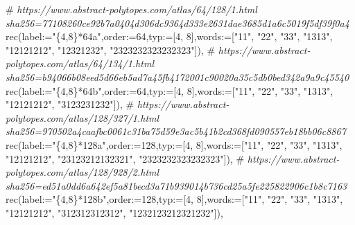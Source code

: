 \documentclass[
  10pt,
  letterpaper,
]{article}
\newenvironment{Shaded}{}{}
\newcommand{\CommentTok}[1]{\textcolor[rgb]{0.38,0.63,0.69}{\textit{#1}}}
\newcommand{\ExtensionTok}[1]{#1}
\newcommand{\FloatTok}[1]{\textcolor[rgb]{0.25,0.63,0.44}{#1}}
\newcommand{\NormalTok}[1]{#1}
\newcommand{\OperatorTok}[1]{\textcolor[rgb]{0.40,0.40,0.40}{#1}}
\newcommand{\StringTok}[1]{\textcolor[rgb]{0.25,0.44,0.63}{#1}}
\newcommand{\VariableTok}[1]{\textcolor[rgb]{0.10,0.09,0.49}{#1}}
\begin{document}
\begin{Shaded}
\begin{Highlighting}[]
\NormalTok{\#}\CommentTok{ https://www.abstract{-}polytopes.com/atlas/64/128/1.html sha256=77108260ce92b7a0404d306dc9364d333e2631dae3685d1a6c5019f5df39f0a4}
\ExtensionTok{rec}\NormalTok{(}\VariableTok{label}\OperatorTok{:=}\StringTok{"\{4,8\}*64a"}\OperatorTok{,}\VariableTok{order}\OperatorTok{:=}\FloatTok{64}\OperatorTok{,}\VariableTok{typ}\OperatorTok{:=}\NormalTok{[}\FloatTok{4}\OperatorTok{,} \FloatTok{8}\NormalTok{]}\OperatorTok{,}\VariableTok{words}\OperatorTok{:=}\NormalTok{[}\StringTok{"11"}\OperatorTok{,} \StringTok{"22"}\OperatorTok{,} \StringTok{"33"}\OperatorTok{,} \StringTok{"1313"}\OperatorTok{,} \StringTok{"12121212"}\OperatorTok{,} \StringTok{"12321232"}\OperatorTok{,} \StringTok{"2323232323232323"}\NormalTok{])}\OperatorTok{,}
\NormalTok{\#}\CommentTok{ https://www.abstract{-}polytopes.com/atlas/64/134/1.html sha256=b94066b08eed5d66eb5ad7a45fb4172001c90020a35c5db0bed342a9a9c45540}
\ExtensionTok{rec}\NormalTok{(}\VariableTok{label}\OperatorTok{:=}\StringTok{"\{4,8\}*64b"}\OperatorTok{,}\VariableTok{order}\OperatorTok{:=}\FloatTok{64}\OperatorTok{,}\VariableTok{typ}\OperatorTok{:=}\NormalTok{[}\FloatTok{4}\OperatorTok{,} \FloatTok{8}\NormalTok{]}\OperatorTok{,}\VariableTok{words}\OperatorTok{:=}\NormalTok{[}\StringTok{"11"}\OperatorTok{,} \StringTok{"22"}\OperatorTok{,} \StringTok{"33"}\OperatorTok{,} \StringTok{"1313"}\OperatorTok{,} \StringTok{"12121212"}\OperatorTok{,} \StringTok{"3123231232"}\NormalTok{])}\OperatorTok{,}
\NormalTok{\#}\CommentTok{ https://www.abstract{-}polytopes.com/atlas/128/327/1.html sha256=970502a4caafbc0061c31ba75d59e3ac5b41b2cd368fd090557eb18bb06c8867}
\ExtensionTok{rec}\NormalTok{(}\VariableTok{label}\OperatorTok{:=}\StringTok{"\{4,8\}*128a"}\OperatorTok{,}\VariableTok{order}\OperatorTok{:=}\FloatTok{128}\OperatorTok{,}\VariableTok{typ}\OperatorTok{:=}\NormalTok{[}\FloatTok{4}\OperatorTok{,} \FloatTok{8}\NormalTok{]}\OperatorTok{,}\VariableTok{words}\OperatorTok{:=}\NormalTok{[}\StringTok{"11"}\OperatorTok{,} \StringTok{"22"}\OperatorTok{,} \StringTok{"33"}\OperatorTok{,} \StringTok{"1313"}\OperatorTok{,} \StringTok{"12121212"}\OperatorTok{,} \StringTok{"23123212132321"}\OperatorTok{,} \StringTok{"2323232323232323"}\NormalTok{])}\OperatorTok{,}
\NormalTok{\#}\CommentTok{ https://www.abstract{-}polytopes.com/atlas/128/928/2.html sha256=ed51a0dd6a642ef5a81becd3a71b939014b736cd25a5fe225822906c1b8c7163}
\ExtensionTok{rec}\NormalTok{(}\VariableTok{label}\OperatorTok{:=}\StringTok{"\{4,8\}*128b"}\OperatorTok{,}\VariableTok{order}\OperatorTok{:=}\FloatTok{128}\OperatorTok{,}\VariableTok{typ}\OperatorTok{:=}\NormalTok{[}\FloatTok{4}\OperatorTok{,} \FloatTok{8}\NormalTok{]}\OperatorTok{,}\VariableTok{words}\OperatorTok{:=}\NormalTok{[}\StringTok{"11"}\OperatorTok{,} \StringTok{"22"}\OperatorTok{,} \StringTok{"33"}\OperatorTok{,} \StringTok{"1313"}\OperatorTok{,} \StringTok{"12121212"}\OperatorTok{,} \StringTok{"312312312312"}\OperatorTok{,} \StringTok{"1232123212321232"}\NormalTok{])}\OperatorTok{,}

\end{Highlighting}
\end{Shaded}
\end{document}

